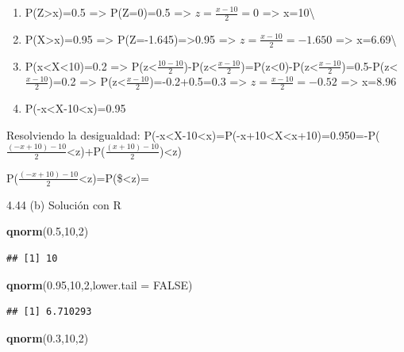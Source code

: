 \documentclass[
]{article}
\newenvironment{Shaded}{\begin{snugshade}}{\end{snugshade}}
\newcommand{\DataTypeTok}[1]{\textcolor[rgb]{0.13,0.29,0.53}{#1}}
\newcommand{\DecValTok}[1]{\textcolor[rgb]{0.00,0.00,0.81}{#1}}
\newcommand{\FloatTok}[1]{\textcolor[rgb]{0.00,0.00,0.81}{#1}}
\newcommand{\KeywordTok}[1]{\textcolor[rgb]{0.13,0.29,0.53}{\textbf{#1}}}
\newcommand{\NormalTok}[1]{#1}
\newcommand{\OtherTok}[1]{\textcolor[rgb]{0.56,0.35,0.01}{#1}}
\begin{document}
\begin{enumerate}
\def\labelenumi{(\alph{enumi})}
\item
  P(Z\textgreater x)=0.5 =\textgreater{} P(Z=0)=0.5 =\textgreater{}
  \(z=\frac{x-10}{2}=0\) =\textgreater{} x=10\textbackslash{}
\item
  P(X\textgreater x)=0.95 =\textgreater{} P(Z=-1.645)=\textgreater0.95
  =\textgreater{} \(z=\frac{x-10}{2}=-1.650\) =\textgreater{}
  x=6.69\textbackslash{}
\item
  P(x\textless X\textless10)=0.2 =\textgreater{}
  P(z\textless{}\(\frac{10-10}{2}\))-P(z\textless{}\(\frac{x-10}{2}\))=P(z\textless0)-P(z\textless{}\(\frac{x-10}{2}\))=0.5-P(z\textless{}\(\frac{x-10}{2}\))=0.2
  =\textgreater{} P(z\textless{}\(\frac{x-10}{2}\))=-0.2+0.5=0.3
  =\textgreater{} \(z=\frac{x-10}{2}=-0.52\) =\textgreater{} x=8.96
\item
  P(-x\textless X-10\textless x)=0.95
\end{enumerate}

Resolviendo la desigualdad:
P(-x\textless X-10\textless x)=P(-x+10\textless X\textless x+10)=0.950=-P(\(\frac{(-x+10)-10}{2}\)\textless z)+P(\(\frac{(x+10)-10}{2}\))\textless z)

P(\(\frac{(-x+10)-10}{2}\)\textless z)=P(\$\textless z)=

4.44 (b) Solución con R

\begin{Shaded}
\begin{Highlighting}[]
\KeywordTok{qnorm}\NormalTok{(}\FloatTok{0.5}\NormalTok{,}\DecValTok{10}\NormalTok{,}\DecValTok{2}\NormalTok{)}
\end{Highlighting}
\end{Shaded}

\begin{verbatim}
## [1] 10
\end{verbatim}

\begin{Shaded}
\begin{Highlighting}[]
\KeywordTok{qnorm}\NormalTok{(}\FloatTok{0.95}\NormalTok{,}\DecValTok{10}\NormalTok{,}\DecValTok{2}\NormalTok{,}\DataTypeTok{lower.tail =} \OtherTok{FALSE}\NormalTok{)}
\end{Highlighting}
\end{Shaded}

\begin{verbatim}
## [1] 6.710293
\end{verbatim}

\begin{Shaded}
\begin{Highlighting}[]
\KeywordTok{qnorm}\NormalTok{(}\FloatTok{0.3}\NormalTok{,}\DecValTok{10}\NormalTok{,}\DecValTok{2}\NormalTok{)}
\end{Highlighting}
\end{Shaded}
\end{document}
